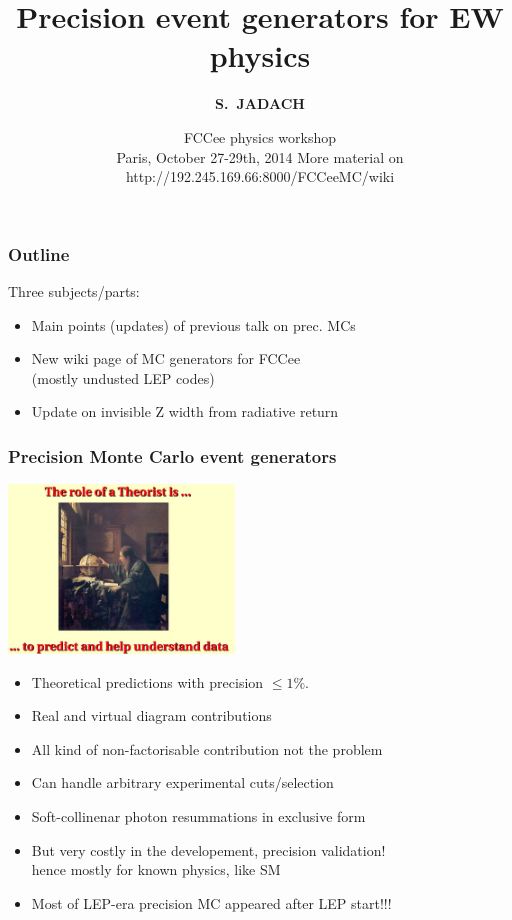 \documentclass{beamer}
\title[Precision Monte Carlo generators] %
{ {\bf Precision event generators for EW physics}
} %
\author[S.~Jadach] %
{\Large\bf S.~JADACH }
\institute[Universities of Somewhere and Elsewhere] %
{ {\large\crd IFJ-PAN, Krak\'ow, Poland}\\
  {~~~}\\
  {\footnotesize
  Partly supported by Polish Government grant\\
  {\em Narodowe Centrum Nauki} DEC-2011/03/B/ST2/02632
}}
\date[Short Occasion] %
{\small FCCee physics workshop\\
   Paris, October 27-29th, 2014
\vskip 4mm
 \footnotesize
  More material on http://192.245.169.66:8000/FCCeeMC/wiki
}
\newcommand{\cbl}{\color{blue}}
\begin{document}
\begin{frame}
  \titlepage
\end{frame}


\begin{frame}[fragile]
\frametitle{\bf Outline}

\vspace{2mm}
\large\cbl
Three subjects/parts:
\begin{itemize}
\item\cbl
 Main points (updates) of previous talk on prec. MCs
\item
 New wiki page of MC generators for FCCee\\
 (mostly undusted LEP codes)
\item
 Update on invisible Z width from radiative return
\end{itemize}
\end{frame}

\begin{frame}[fragile]
\frametitle{\bf Precision Monte Carlo event generators}

\vspace{-3mm}
\includegraphics[width=60mm]{./sli0.jpg}

\begin{itemize}
\item\cbl
 Theoretical predictions with precision $\leq 1\%$.
\item
 Real and virtual diagram contributions
\item
 All kind of non-factorisable contribution not the problem
\item
 Can handle arbitrary experimental cuts/selection
\item
 Soft-collinenar photon resummations in exclusive form
\item
 But very costly in the developement, precision validation!\\
 hence mostly for known physics, like SM
\item
 Most of LEP-era precision MC appeared after LEP start!!!
\end{itemize}
\
\end{frame}
\end{document}
